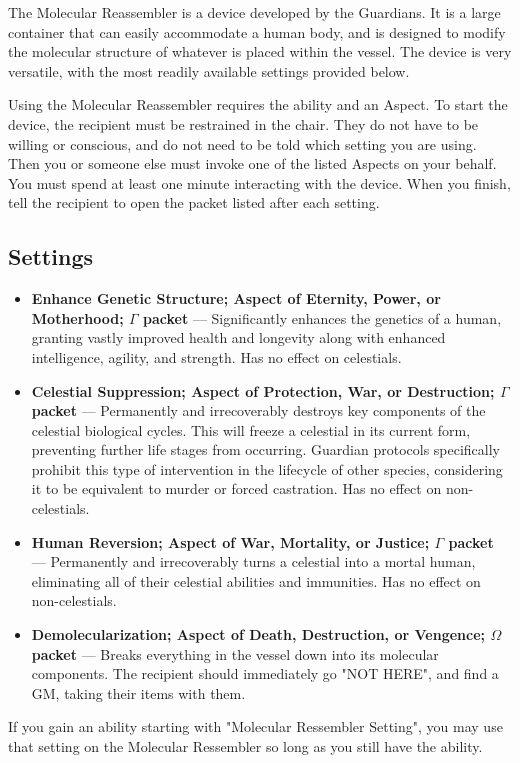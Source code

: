 \documentclass[green]{guardians}
\begin{document}
\name{\gReassembler{}}

The Molecular Reassembler is a device developed by the Guardians. It is a large container that can easily accommodate a human body, and is designed to modify the molecular structure of whatever is placed within the vessel. The device is very versatile, with the most readily available settings provided below.

Using the Molecular Reassembler requires the \aGuardianTech{} ability and an Aspect. To start the device, the recipient must be restrained in the chair. They do not have to be willing or conscious, and do not need to be told which setting you are using. Then you or someone else must invoke one of the listed Aspects on your behalf. You must spend at least one minute interacting with the device. When you finish, tell the recipient to open the packet listed after each setting.

\subsection{Settings}

\begin{itemize}
  \item \textbf{Enhance Genetic Structure; Aspect of Eternity, Power, or Motherhood; $\Gamma$ packet} --- Significantly enhances the genetics of a human, granting vastly improved health and longevity along with enhanced intelligence, agility, and strength. Has no effect on celestials.
  \item \textbf{Celestial Suppression; Aspect of Protection, War, or Destruction; $\Gamma$ packet} --- Permanently and irrecoverably destroys key components of the celestial biological cycles. This will freeze a celestial in its current form, preventing further life stages from occurring. Guardian protocols specifically prohibit this type of intervention in the lifecycle of other species, considering it to be equivalent to murder or forced castration. Has no effect on non-celestials.
	\item \textbf{Human Reversion; Aspect of War, Mortality, or Justice; $\Gamma$ packet} --- Permanently and irrecoverably turns a celestial into a mortal human, eliminating all of their celestial abilities and immunities. Has no effect on non-celestials.
	\item \textbf{Demolecularization; Aspect of Death, Destruction, or Vengence; $\Omega$ packet} --- Breaks everything in the vessel down into its molecular components. The recipient should immediately go "NOT HERE", and find a GM, taking their items with them.
	
\end{itemize}

If you gain an ability starting with "Molecular Ressembler Setting", you may use that setting on the Molecular Ressembler so long as you still have the \aGuardianTech{} ability.
\end{document}
